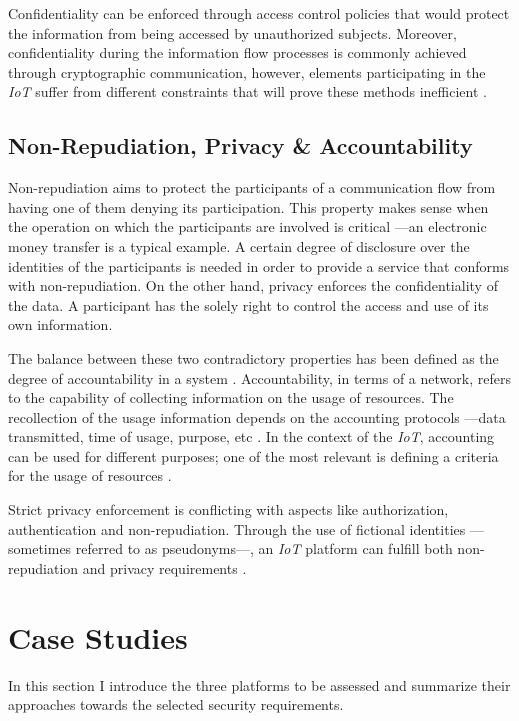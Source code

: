\documentclass[journal]{IEEEtran}
\begin{document}
  Confidentiality can be enforced through access control policies that would protect the information from being accessed by unauthorized subjects. Moreover, confidentiality during the information flow processes is commonly achieved through cryptographic communication, however, elements participating in the \emph{IoT} suffer from different constraints that will prove these methods inefficient \cite{Baldini2012}.    

  \subsection{Non-Repudiation, Privacy \& Accountability} \label{Non-Repudiation}
  Non-repudiation aims to protect the participants of a communication flow from having one of them denying its participation. This property makes sense when the operation on which the participants are involved is critical ---an electronic money transfer is a typical example. A certain degree of disclosure over the identities of the participants is needed in order to provide a service that conforms with non-repudiation. On the other hand, privacy enforces the confidentiality of the data. A participant has the solely right to control the access and use of its own information.

  The balance between these two contradictory properties has been defined as the degree of accountability in a system \cite{Bassi2013}. Accountability, in terms of a network, refers to the capability of collecting information on the usage of resources. The recollection of the usage information depends on the accounting protocols ---data transmitted, time of usage, purpose, etc  \cite{Sklavos2007}. In the context of the \emph{IoT}, accounting can be used for different purposes; one of the most relevant is defining a criteria for the usage of resources \cite{Bauge2010}.

  Strict privacy enforcement is conflicting with aspects like authorization, authentication and non-repudiation. Through the use of fictional identities ---sometimes referred to as pseudonyms---, an \emph{IoT} platform can fulfill both non-repudiation and privacy requirements \cite{Baldini2012}. 
  
\section{Case Studies}
  In this section I introduce the three platforms to be assessed and summarize their approaches towards the selected security requirements.
\end{document}
